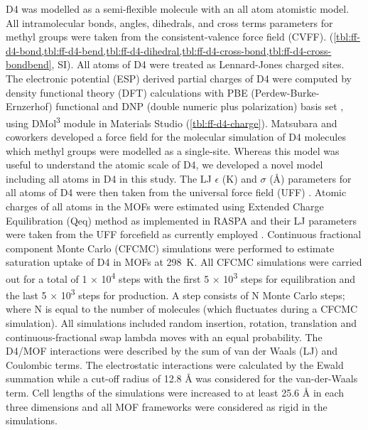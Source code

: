 D4 was modelled as a semi-flexible molecule with an all atom atomistic model.
All intramolecular bonds, angles, dihedrals, and cross terms parameters for
methyl groups were taken from the consistent-valence force field (CVFF).
\citep{dauber-osguthorpeStructureEnergeticsLigand1988}
(\cref{tbl:ff-d4-bond,tbl:ff-d4-bend,tbl:ff-d4-dihedral,tbl:ff-d4-cross-bond,tbl:ff-d4-cross-bondbend},
SI). All atoms of D4 were treated as Lennard-Jones charged sites. The electronic
potential (ESP) derived partial charges of D4 were computed by density
functional theory (DFT) calculations with PBE (Perdew-Burke-Ernzerhof)
functional \citep{perdewGeneralizedGradientApproximation1996} and DNP (double
numeric plus polarization) basis set
\citep{hehreSelfconsistentMolecularOrbital1972}, using DMol\textsuperscript{3}
module \citep{delleyAllElectronNumerical1990} in Materials Studio
\citep{accelrysMaterialsStudio2001} (\cref{tbl:ff-d4-charge}). Matsubara and
coworkers \citep{matsubaraDesignVersatileForce2010} developed a force field for
the molecular simulation of D4 molecules which methyl groups were modelled as a
single-site. Whereas this model was useful to understand the atomic scale of D4,
we developed a novel model including all atoms in D4 in this study. The LJ
\(\epsilon\) (K) and \(\sigma\) (Å) parameters for all atoms of D4 were then
taken from the universal force field (UFF) \citep{rappeUFFFullPeriodic1992}.
Atomic charges of all atoms in the MOFs were estimated using Extended Charge
Equilibration (Qeq) method as implemented in RASPA
\citep{dubbeldamRASPAMolecularSimulation2016} and their LJ parameters were taken
from the UFF forcefield as currently employed
\citep{qiaoHighthroughputComputationalScreening2017,
keskinProgressOpportunitiesChallenges2009}. Continuous fractional component
Monte Carlo (CFCMC) simulations were performed to estimate saturation uptake of
D4 in MOFs at \SI{298}{\kelvin}. All CFCMC simulations were carried out for a
total of 1 × 10\textsuperscript{4} steps with the first 5 ×
10\textsuperscript{3} steps for equilibration and the last 5 ×
10\textsuperscript{3} steps for production. A step consists of N Monte Carlo
steps; where N is equal to the number of molecules (which fluctuates during a
CFCMC simulation). All simulations included random insertion, rotation,
translation and continuous-fractional swap lambda moves with an equal
probability. The D4/MOF interactions were described by the sum of van der Waals
(LJ) and Coulombic terms. The electrostatic interactions were calculated by the
Ewald summation \citep{ewaldBerechnungOptischerUnd1921} while a cut-off radius
of 12.8 Å was considered for the van-der-Waals term. Cell lengths of the
simulations were increased to at least 25.6 Å in each three dimensions and all
MOF frameworks were considered as rigid in the simulations.

